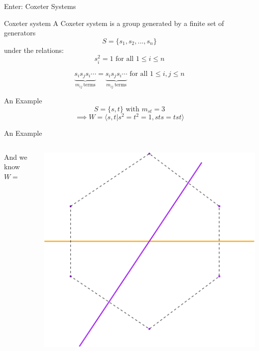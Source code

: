 \documentclass[aspectratio=169,xcolor=dvipsnames]{beamer}
\begin{document}
\begin{frame}{Enter: Coxeter Systems}
    \begin{block}{Coxeter system}
        A Coxeter system is a group generated by a finite set of generators 
        \[S = \{s_1, s_2, ... , s_n\} \]
        under the relations: 
        \[s_i^2=1 \text{ for all }1\leq i \leq n\]

        \[\underbrace{s_i s_j s_i \cdots}_{m_{ij}\ \text{terms}}=\underbrace{s_i s_j s_i \cdots}_{m_{ij}\ \text{terms}}\text{ for all } 1 \leq i, j \leq n\]
    \end{block}
    
\end{frame}

\begin{frame}{An Example}
    \[S=\{s, t\} \text{ with } m_{st}=3\]
    \[\implies W = \langle s, t| s^2=t^2=1, sts=tst\rangle \]
\end{frame}


\begin{frame}{An Example}

    \setlength{\columnsep}{0.1em}

    \begin{columns}
        \begin{column}{0.5\textwidth}
            And we know $W = $
        \end{column}

        \begin{column}{0.5\textwidth}
            \centering
            \includegraphics[width=0.9\linewidth]{frameLast.png}
        \end{column}
    \end{columns}

\end{frame}
\end{document}
